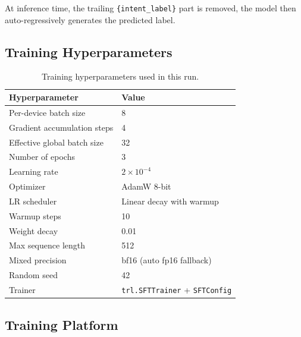 \documentclass[12pt,a4paper]{article}
\begin{document}
At inference time, the trailing \texttt{\{intent\_label\}} part is removed,
the model then auto-regressively generates the predicted label.

\subsection{Training Hyperparameters}

\begin{table}[H]
    \centering
    \caption{Training hyperparameters used in this run.}
    \label{tab:training-hp}
    \begin{tabular}{ll}
        \toprule
        \textbf{Hyperparameter}         & \textbf{Value}                       \\
        \midrule
        Per-device batch size           & 8                                    \\
        Gradient accumulation steps     & 4                                    \\
        Effective global batch size     & 32                                   \\
        Number of epochs                & 3                                    \\
        Learning rate                   & $2 \times 10^{-4}$                   \\
        Optimizer                       & AdamW 8-bit                          \\
        LR scheduler                    & Linear decay with warmup             \\
        Warmup steps                    & 10                                   \\
        Weight decay                    & 0.01                                 \\
        Max sequence length             & 512                                  \\
        Mixed precision                 & bf16 (auto fp16 fallback)            \\
        Random seed                     & 42                                   \\
        Trainer                         & \texttt{trl.SFTTrainer} + \texttt{SFTConfig} \\
        \bottomrule
    \end{tabular}
\end{table}

\subsection{Training Platform}
\end{document}
